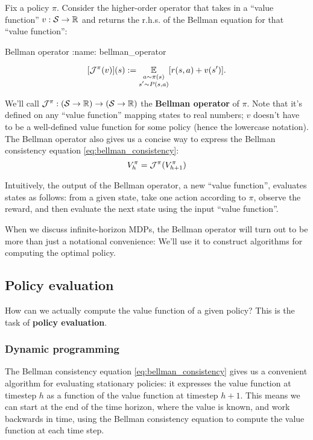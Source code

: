 \documentclass[\main/main]{subfiles}
\begin{document}
Fix a policy $\pi$. Consider the higher-order operator that takes in a ``value function'' $v : \mathcal{S} \to \mathbb{R}$ and returns the r.h.s. of the Bellman equation for that ``value function'':

\begin{definition}{Bellman operator}
:name: bellman_operator

\[
    [\mathcal{J}^{\pi}(v)](s) := \operatorname*{\mathbb{E}}_{\substack{a \sim \pi(s) \\ s' \sim P(s, a)}} [r(s, a) + v(s')].
\]
\end{definition}

We'll call $\mathcal{J}^\pi : (\mathcal{S} \to \mathbb{R}) \to (\mathcal{S} \to \mathbb{R})$ the \textbf{Bellman operator} of $\pi$. Note that it's defined on any ``value function'' mapping states to real numbers; $v$ doesn't have to be a well-defined value function for some policy (hence the lowercase notation). The Bellman operator also gives us a concise way to express the Bellman consistency equation \eqref{eq:bellman_consistency}:
\[
    V_h^\pi = \mathcal{J}^{\pi}(V_{h+1}^\pi)
\]

Intuitively, the output of the Bellman operator, a new ``value function'', evaluates states as follows: from a given state, take one action according to $\pi$, observe the reward, and then evaluate the next state using the input ``value function''.

When we discuss infinite-horizon MDPs, the Bellman operator will turn out to be more than just a notational convenience: We'll use it to construct algorithms for computing the optimal policy.

\subsection{Policy evaluation}

How can we actually compute the value function of a given policy? This is the task of \textbf{policy evaluation}.

\subsubsection{Dynamic programming}
\label{sec:dp}

The Bellman consistency equation \eqref{eq:bellman_consistency} gives us a convenient algorithm for evaluating stationary policies: it expresses the value function at timestep $h$ as a function of the value function at timestep $h+1$. This means we can start at the end of the time horizon, where the value is known, and work backwards in time, using the Bellman consistency equation to compute the value function at each time step.
\end{document}
